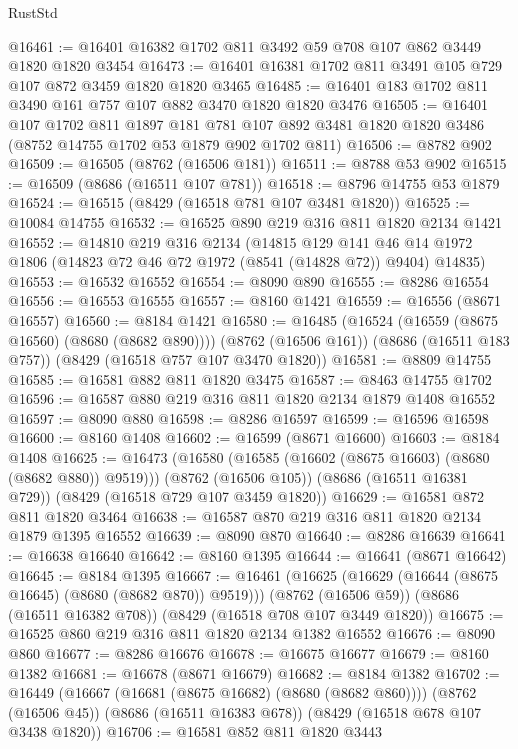 \begin{lexlean}{RustStd}
\begin{coremodule}
@16461 := @16401 @16382 @1702 @811 @3492 @59 @708 @107 @862 @3449 @1820 @1820 @3454
@16473 := @16401 @16381 @1702 @811 @3491 @105 @729 @107 @872 @3459 @1820 @1820 @3465
@16485 := @16401 @183 @1702 @811 @3490 @161 @757 @107 @882 @3470 @1820 @1820 @3476
@16505 := @16401
    @107
    @1702
    @811
    @1897
    @181
    @781
    @107
    @892
    @3481
    @1820
    @1820
    @3486
    (@8752 @14755 @1702 @53 @1879 @902 @1702 @811)
@16506 := @8782 @902
@16509 := @16505 (@8762 (@16506 @181))
@16511 := @8788 @53 @902
@16515 := @16509 (@8686 (@16511 @107 @781))
@16518 := @8796 @14755 @53 @1879
@16524 := @16515 (@8429 (@16518 @781 @107 @3481 @1820))
@16525 := @10084 @14755
@16532 := @16525 @890 @219 @316 @811 @1820 @2134 @1421
@16552 := @14810
    @219
    @316
    @2134
    (@14815
      @129
      @141
      @46
      @14
      @1972
      @1806
      (@14823 @72 @46 @72 @1972 (@8541 (@14828 @72)) @9404)
      @14835)
@16553 := @16532 @16552
@16554 := @8090 @890
@16555 := @8286 @16554
@16556 := @16553 @16555
@16557 := @8160 @1421
@16559 := @16556 (@8671 @16557)
@16560 := @8184 @1421
@16580 := @16485
    (@16524 (@16559 (@8675 @16560) (@8680 (@8682 @890))))
    (@8762 (@16506 @161))
    (@8686 (@16511 @183 @757))
    (@8429 (@16518 @757 @107 @3470 @1820))
@16581 := @8809 @14755
@16585 := @16581 @882 @811 @1820 @3475
@16587 := @8463 @14755 @1702
@16596 := @16587 @880 @219 @316 @811 @1820 @2134 @1879 @1408 @16552
@16597 := @8090 @880
@16598 := @8286 @16597
@16599 := @16596 @16598
@16600 := @8160 @1408
@16602 := @16599 (@8671 @16600)
@16603 := @8184 @1408
@16625 := @16473
    (@16580 (@16585 (@16602 (@8675 @16603) (@8680 (@8682 @880)) @9519)))
    (@8762 (@16506 @105))
    (@8686 (@16511 @16381 @729))
    (@8429 (@16518 @729 @107 @3459 @1820))
@16629 := @16581 @872 @811 @1820 @3464
@16638 := @16587 @870 @219 @316 @811 @1820 @2134 @1879 @1395 @16552
@16639 := @8090 @870
@16640 := @8286 @16639
@16641 := @16638 @16640
@16642 := @8160 @1395
@16644 := @16641 (@8671 @16642)
@16645 := @8184 @1395
@16667 := @16461
    (@16625 (@16629 (@16644 (@8675 @16645) (@8680 (@8682 @870)) @9519)))
    (@8762 (@16506 @59))
    (@8686 (@16511 @16382 @708))
    (@8429 (@16518 @708 @107 @3449 @1820))
@16675 := @16525 @860 @219 @316 @811 @1820 @2134 @1382 @16552
@16676 := @8090 @860
@16677 := @8286 @16676
@16678 := @16675 @16677
@16679 := @8160 @1382
@16681 := @16678 (@8671 @16679)
@16682 := @8184 @1382
@16702 := @16449
    (@16667 (@16681 (@8675 @16682) (@8680 (@8682 @860))))
    (@8762 (@16506 @45))
    (@8686 (@16511 @16383 @678))
    (@8429 (@16518 @678 @107 @3438 @1820))
@16706 := @16581 @852 @811 @1820 @3443

\end{coremodule}
\end{lexlean}
